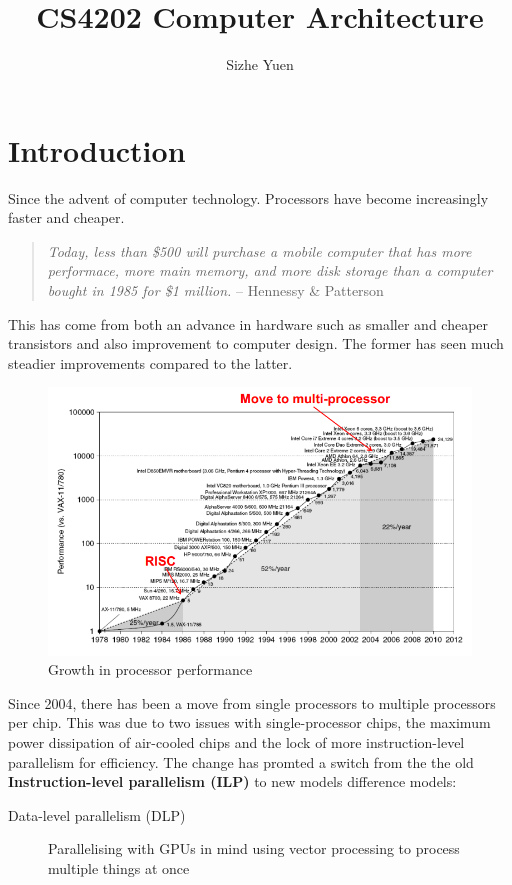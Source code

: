 \documentclass[11pt]{article}
\author{Sizhe Yuen}
\title{CS4202 Computer Architecture}
\begin{document}
\maketitle
\tableofcontents

\newcommand{\n}[0]{\\[\baselineskip]}

\section{Introduction}
Since the advent of computer technology. Processors have become increasingly faster and cheaper.
\begin{quote}
\emph{Today, less than \$500 will purchase a mobile computer that has more performace, more main memory, and more disk storage than a computer bought in 1985 for \$1 million.} -- Hennessy \& Patterson
\end{quote}
This has come from both an advance in hardware such as smaller and cheaper transistors and also improvement to computer design. The former has seen much steadier improvements compared to the latter.
\begin{figure}[H]
\centering
\includegraphics[width=.9\textwidth]{imgs/growth.png}
\caption{Growth in processor performance}
\end{figure}
\noindent
Since 2004, there has been a move from single processors to multiple processors per chip. This was due to two issues with single-processor chips, the maximum power dissipation of air-cooled chips and the lock of more instruction-level parallelism for efficiency. The change has promted a switch from the the old \textbf{Instruction-level parallelism (ILP)} to new models difference models:
\begin{description}
\item[{Data-level parallelism (DLP)}] Parallelising with GPUs in mind using vector processing to process multiple things at once
\end{description}
\end{document}

